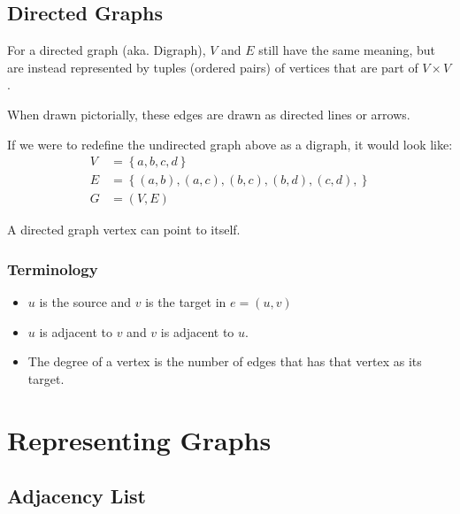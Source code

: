 \subsection{Directed Graphs}\label{sub:directed_graphs}

For a directed graph (aka. Digraph), \(V\) and \(E\) still have the same meaning, but are instead represented by tuples (ordered pairs) of vertices that are part of  \(V \times V\).
\begin{note}
    When drawn pictorially, these edges are drawn as directed lines or arrows.
\end{note}
If we were to redefine the undirected graph above as a digraph, it would look like:
\begin{align*}
    V & = \left\{ a, b, c, d \right\}                                                                                              \\
    E & = \left\{ \left( a, b \right), \left( a, c \right), \left( b, c \right), \left( b, d \right), \left( c, d \right),\right\} \\
    G & = \left(V, E\right)
\end{align*}
\begin{note}
    A directed graph vertex can point to itself.
\end{note}

\subsubsection{Terminology}\label{ssub:directed_graph_terminology}

\begin{itemize}
    \item \(u\) is the source and \(v\) is the target in \(e = (u, v)\)
    \item \(u\) is adjacent to \(v\) and \(v\) is adjacent to \(u\).
    \item The degree of a vertex is the number of edges that has that vertex as its target.
\end{itemize}

\section{Representing Graphs}\label{sec:representing_graphs}

\subsection{Adjacency List}\label{sub:adjacency_list}


